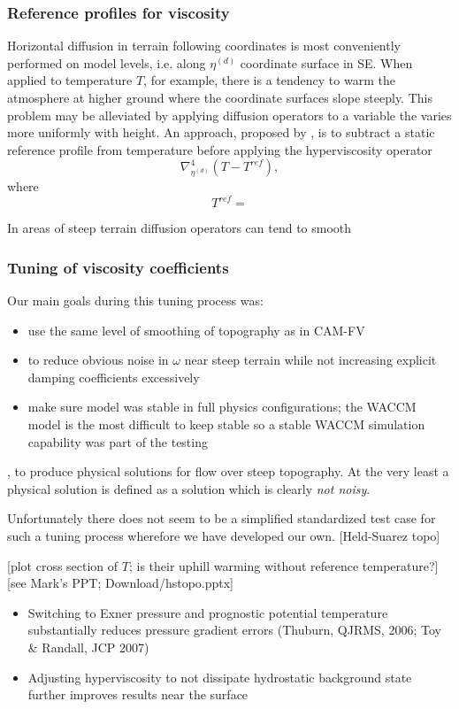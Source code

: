 \documentclass[draft]{agujournal2019}
\begin{document}
\subsubsection{Reference profiles for viscosity}
Horizontal diffusion in terrain following coordinates is most conveniently performed on model levels, i.e. along $\eta^{(d)}$ coordinate surface in SE. When applied to temperature $T$, for example, there is a tendency to warm the atmosphere at higher ground where the coordinate surfaces slope steeply. This problem may be alleviated by applying diffusion operators to a variable the varies more uniformly with height. An approach, proposed by , is to subtract a static reference profile from temperature before applying the hyperviscosity operator
\begin{equation}
\nabla^4_{\eta^{(d)}}\left( T-T^{ref}\right),
\end{equation}
where
\begin{equation}
T^{ref}=
\end{equation}


In areas of steep terrain diffusion operators can tend to smooth


\subsubsection{Tuning of viscosity coefficients}
Our main goals during this tuning process was:
\begin{itemize}
\item use the same level of smoothing of topography as in CAM-FV
\item to reduce obvious noise in $\omega$ near steep terrain while not increasing explicit damping coefficients excessively
\item make sure model was stable in full physics configurations; the WACCM model is the most difficult to keep stable so a stable WACCM simulation capability was part of the testing
\end{itemize}

, to produce physical solutions for flow over steep topography. At the very least a physical solution is defined as a solution which is clearly {\em{not noisy}}. 

Unfortunately there does not seem to be a simplified standardized test case for such a tuning process wherefore we have developed our own.
[Held-Suarez topo]


[plot cross section of $T$; is their uphill warming without reference temperature?]
[see Mark's PPT; Download/hstopo.pptx]
\begin{itemize}
\item Switching to Exner pressure and prognostic potential temperature substantially reduces pressure gradient errors  (Thuburn, QJRMS, 2006; Toy \& Randall, JCP 2007)
\item Adjusting hyperviscosity to not dissipate hydrostatic background state further improves results near the surface
\end{itemize}
\end{document}
